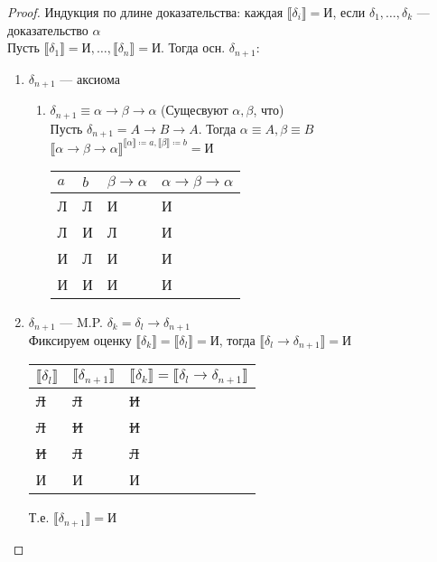 \documentclass[oneside]{book}
\newcommand{\llb}{\llbracket}
\newcommand{\rrb}{\rrbracket}
\theoremstyle{plain}
\theoremstyle{remark}
\theoremstyle{definition}
\begin{document}
\begin{proof}
Индукция по длине доказательства: каждая \(\llb \delta_i \rrb = \text{И}\), если \(\delta_1, \dots, \delta_k\) --- доказательство \(\alpha\) \\
Пусть \(\llb \delta_1 \rrb = \text{И}, \dots, \llb \delta_n \rrb = \text{И}\). Тогда осн. \(\delta_{n + 1}\):
\begin{enumerate}
\item \(\delta_{n + 1}\) --- аксиома
\begin{enumerate}
\item \(\delta_{n + 1} \equiv \alpha \to \beta \to \alpha\) (Сущесвуют \(\alpha, \beta\), что) \\
Пусть \(\delta_{n + 1} = A \to B \to A\). Тогда \(\alpha \equiv A, \beta \equiv B\) \\
\(\llb \alpha \to \beta \to \alpha \rrb ^{\llb \alpha \rrb \coloneqq a, \llb \beta \rrb \coloneqq b} = \text{И}\)
\begin{center}
\begin{tabular}{ll|l|l}
\(a\) & \(b\) & \(\beta \to \alpha\) & \(\alpha \to \beta \to \alpha\)\\
\hline
Л & Л & И & И\\
Л & И & Л & И\\
И & Л & И & И\\
И & И & И & И\\
\end{tabular}
\end{center}
\end{enumerate}
\item \(\delta_{n + 1}\) --- M.P. \(\delta_k = \delta_l \to \delta_{n + 1}\) \\
Фиксируем оценку \(\llb \delta_k \rrb = \llb \delta_l \rrb = \text{И}\), тогда \(\llb \delta_l \to \delta_{n + 1} \rrb = \text{И}\)
\begin{center}
\begin{tabular}{lll}
\(\llb \delta_l \rrb\) & \(\llb \delta_{n + 1} \rrb\) & \(\llb \delta_k \rrb = \llb \delta_l \to \delta_{n + 1} \rrb\)\\
\hline
\sout{Л} & \sout{Л} & \sout{И}\\
\sout{Л} & \sout{И} & \sout{И}\\
\sout{И} & \sout{Л} & \sout{Л}\\
И & И & И\\
\end{tabular}
\end{center}
Т.е. \(\llb \delta_{n + 1} \rrb = \text{И}\)
\end{enumerate}
\end{proof}
\end{document}
